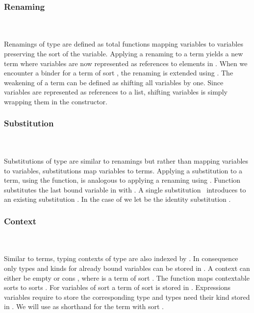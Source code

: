 \subsubsection{Renaming}\hfill\\\\
Renamings  of type    are defined as total functions mapping variables    to variables    preserving the sort  of the variable.
\FRen
Applying a renaming    to a term    yields a new term    where variables are now represented as references to elements in .
\Fren
When we encounter a binder for a term of sort , the renaming is extended using \Frenext. 
The weakening of a term can be defined as shifting all variables by one.
\Fwk 
Since variables are represented as references to a list, shifting variables is simply wrapping them in the  constructor.

\subsubsection{Substitution}\hfill\\\\
Substitutions  of type    are similar to renamings but rather than mapping variables to variables, substitutions map variables to terms.
\FSub
Applying a substitution to a term, using the  function, is analogous to applying a renaming using . 
Function  \Data{[}  \Data{]} substitutes the last bound variable in  with .
\Fsubs
A single substitution \Fsinglesub\ introduces  to an existing substitution . In the case of \Data{\_[\_]} we let  be the identity substitution \Fidsub.

\subsubsection{Context}\hfill\\\\
Similar to terms, typing contexts  of type   are also indexed by . In consequence only types and kinds for already bound variables can be stored in .
\FCtx
A context can either be empty  or cons   , where  is a term of sort  . The function  maps contextable sorts  to sorts . For variables of sort  a term of sort  is stored in .
\Fkind
Expressions variables require  to store the corresponding type and types need their kind stored in . We will use  as shorthand for the term with sort  . 
